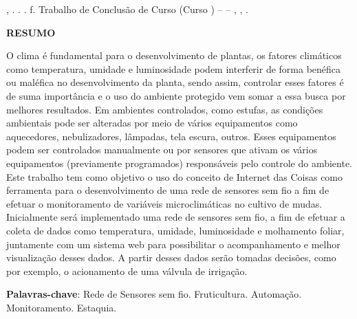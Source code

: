 %
%
\begin{RESUMO}

\thispagestyle{empty}
    \begin{SingleSpace}
	\noindent
		{\expandafter\uppercase\expandafter{\imprimirsobrenomeautor}}, {\imprimirnomeautor}. \textbf{{\imprimirtitulotb}}. {\imprimirdata}. \pageref{LastPage}f. Trabalho de Conclusão de Curso (Curso {\imprimirprograma}) – {\imprimirinstituicao} – {\imprimirdepartamento}, {\imprimirlocal}, {\imprimirdata}.
		
	\end{SingleSpace}
    
    \vspace{1cm}
    
    \begin{center}
	    \textbf{RESUMO}
    \end{center}
    
	\begin{SingleSpace}
	\hspace{-1.2 cm}O clima é fundamental para o desenvolvimento de plantas, os fatores climáticos como  temperatura, umidade e luminosidade podem interferir de forma benéfica ou maléfica no desenvolvimento da planta, sendo assim, controlar esses fatores é de suma importância e o uso do ambiente protegido vem somar a essa busca por melhores resultados. Em ambientes controlados, como estufas, as condições ambientais pode ser alteradas por meio de vários equipamentos como aquecedores, nebulizadores, lâmpadas, tela escura, outros. Esses equipamentos podem ser controlados manualmente ou por sensores que ativam os vários equipamentos (previamente programados) responsáveis pelo controle do ambiente. 
	Este trabalho tem como objetivo o uso do conceito de Internet das Coisas como ferramenta para o desenvolvimento de uma rede de sensores sem fio a fim de efetuar o monitoramento de variáveis microclimáticas no cultivo de mudas. Inicialmente será implementado uma rede de sensores sem fio, a fim de efetuar a coleta de dados como temperatura, umidade, luminosidade e molhamento foliar, juntamente com um sistema web para possibilitar o acompanhamento e melhor visualização desses dados. A partir desses dados serão tomadas decisões, como por exemplo, o acionamento de uma válvula de irrigação.

	\vspace*{0.5cm}\hspace{-1.3 cm}\textbf{Palavras-chave}: Rede de Sensores sem fio. Fruticultura. Automação. Monitoramento. Estaquia.
		
	\end{SingleSpace}
\end{RESUMO}


